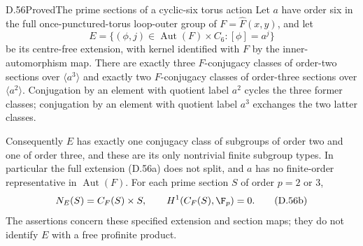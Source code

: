 \begin{claim}{D.56}{Proved}{The prime sections of a cyclic-six torus action}
Let $a$ have order six in the full once-punctured-torus
loop-outer group of $F=\widehat F(x,y)$, and let
\[
 E=\{(\phi,j)\in\operatorname{Aut}(F)\times C_6:
                                      [\phi]=a^j\}
                                                               \tag{D.56a}
\]
be its centre-free extension, with kernel identified
with $F$ by the inner-automorphism map.
There are exactly three $F$-conjugacy classes of
order-two sections over $\langle a^3\rangle$ and
exactly two $F$-conjugacy classes of order-three
sections over $\langle a^2\rangle$.
Conjugation by an element with quotient label $a^2$
cycles the three former classes; conjugation by an
element with quotient label $a^3$ exchanges the two
latter classes.

Consequently $E$ has exactly one conjugacy class
of subgroups of order two and one of order three,
and these are its only nontrivial finite subgroup
types.  In particular the full extension (D.56a)
does not split, and $a$ has no finite-order
representative in $\operatorname{Aut}(F)$.
For each prime section $S$ of order $p=2$ or $3$,
\[
                 N_E(S)=C_F(S)\times S,
                 \qquad H^1(C_F(S),\F_p)=0.             \tag{D.56b}
\]
The assertions concern these specified extension
and section maps; they do not identify $E$ with
a free profinite product.
\end{claim}
